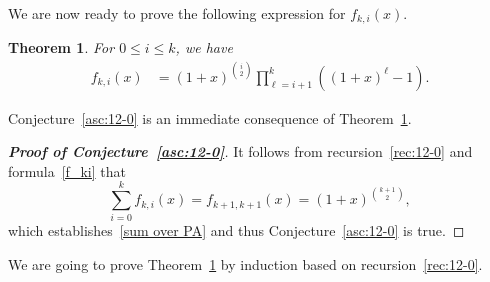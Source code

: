 \documentclass[12pt,A4]{amsart}
\numberwithin{equation}{section}
\theoremstyle{plain}
\newtheorem{theorem}{Theorem}[section]
\theoremstyle{definition}
\begin{document}
We are now ready to prove the following expression for $f_{k,i}(x)$. 


\begin{theorem}\label{gen:conj1}
For $0\le i\le k$,  we have
\begin{align}\label{f_ki}
f_{k,i}(x)&=(1+x)^{\binom{i}{2}}\prod_{\ell=i+1}^{k}\left((1+x)^{\ell}-1\right).
\end{align}
\end{theorem}

Conjecture~\ref{asc:12-0} is an immediate consequence of Theorem~\ref{gen:conj1}.
\begin{proof}[{\bf Proof of Conjecture~\ref{asc:12-0}}]
It follows from recursion~\eqref{rec:12-0} and formula~\eqref{f_ki} that
$$
\sum_{i=0}^k f_{k,i}(x)=f_{k+1,k+1}(x)=(1+x)^{\binom{k+1}{2}},
$$
which establishes~\eqref{sum over PA} and thus Conjecture~\ref{asc:12-0} is true.
\end{proof}

We are going to prove Theorem~\ref{gen:conj1} by induction based on recursion~\eqref{rec:12-0}.
\end{document}
